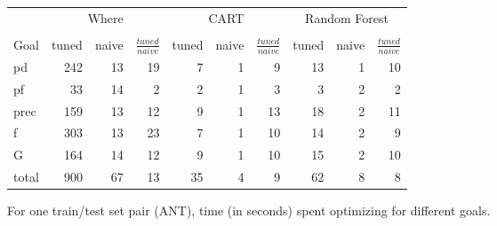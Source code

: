 \documentclass{sig-alternative}
\def\baselinestretch{1}
\begin{document}
\begin{figure}[!ht]

\renewcommand{\baselinestretch}{0.7}
\scriptsize
\centering
  \begin{tabular}{l|rrr|rrr|rrr}
    & \multicolumn{3}{c|}{Where}&\multicolumn{3}{c|}{CART}& \multicolumn{3}{c}{Random Forest}\\\cline{2-10}\\
    Goal & tuned & naive &$\frac{\mathit{tuned}}{\mathit{naive}}$& tuned & naive &$\frac{\mathit{tuned}}{\mathit{naive}}$& tuned & naive&$\frac{\mathit{tuned}}{\mathit{naive}}$\\\hline
pd&242&13&19&7&1&9&13&1&10\\
pf&33&14&2&2&1&3&3&2&2\\
prec&159&13&12&9&1&13&18&2&11\\
f&303&13&23&7&1&10&14&2&9\\
G&164&14&12&9&1&10&15&2&10\\
total&900&67&13&35&4&9&62&8&8\\
  \end{tabular}
  \caption{For one train/test set pair (ANT),  time (in seconds) spent optimizing for different goals.}
\end{figure}
\end{document}
